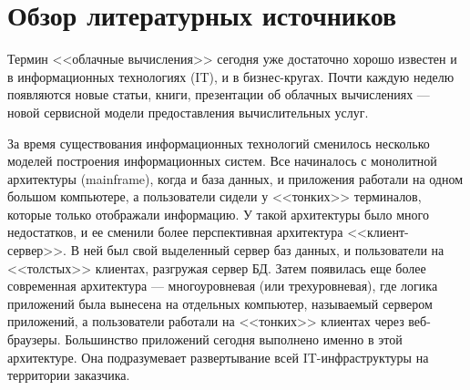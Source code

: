 \section{Обзор литературных источников}

\iffalse
Что я рассказал во введении:
\begin{itemize}
  \item что такое облачные услуги
  \item что такое iaas
  \item для чего нужна виртуализация
\end{itemize}

Примерно на 15-20 страниц.
\begin{itemize}
  \item облака + 
  \item ДЦ, типы для чего нужны tier iii + 
  \item виртуализация +
  \item виды виртуализации +
  \item контейнерная виртуализация +
  \item представители openvz, virtuozzo, docker, lxc, Linux-VServer, solaris zones, jails +
  \item использование
  \item перспективы в виртуализации
\end{itemize}
\fi

Термин <<облачные вычисления>> сегодня уже достаточно хорошо известен и в информационных технологиях (IT), и в бизнес-кругах.
Почти каждую неделю появляются новые статьи, книги, презентации об облачных вычислениях --- новой сервисной модели предоставления вычислительных услуг.

За время существования информационных технологий сменилось несколько моделей построения информационных систем.
Все начиналось с монолитной архитектуры (mainframe), когда и база данных, и приложения работали на одном большом компьютере, а пользователи сидели у <<тонких>> терминалов, которые только отображали информацию.
У такой архитектуры было много недостатков, и ее сменили более перспективная архитектура <<клиент-сервер>>.
В ней был свой выделенный сервер баз данных, и пользователи на <<толстых>> клиентах, разгружая сервер БД.
Затем появилась еще более современная архитектура --- многоуровневая (или трехуровневая), где логика приложений была вынесена на отдельных компьютер, называемый сервером приложений, а пользователи работали на <<тонких>> клиентах через веб-браузеры.
Большинство приложений сегодня выполнено именно в этой архитектуре.
Она подразумевает развертывание всей IT-инфраструктуры на территории заказчика. \cite{oracle-db}


